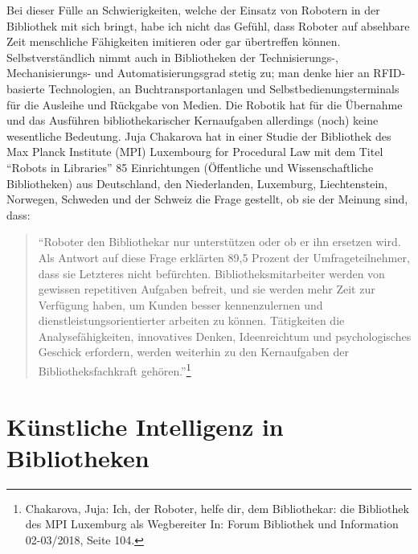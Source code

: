 \documentclass[a4paper,
fontsize=11pt,
oneside,
numbers=noperiodatend,
parskip=half-,
bibliography=totoc,
final
]{scrartcl}
\begin{document}
Bei dieser Fülle an Schwierigkeiten, welche der Einsatz von Robotern in
der Bibliothek mit sich bringt, habe ich nicht das Gefühl, dass Roboter
auf absehbare Zeit menschliche Fähigkeiten imitieren oder gar
übertreffen können. Selbstverständlich nimmt auch in Bibliotheken der
Technisierungs-, Mechanisierungs- und Automatisierungsgrad stetig zu;
man denke hier an RFID-basierte Technologien, an Buchtransportanlagen
und Selbstbedienungsterminals für die Ausleihe und Rückgabe von Medien.
Die Robotik hat für die Übernahme und das Ausführen bibliothekarischer
Kernaufgaben allerdings (noch) keine wesentliche Bedeutung. Juja
Chakarova hat in einer Studie der Bibliothek des Max Planck Institute
(MPI) Luxembourg for Procedural Law mit dem Titel \enquote{Robots in
Libraries} 85 Einrichtungen (Öffentliche und Wissenschaftliche
Bibliotheken) aus Deutschland, den Niederlanden, Luxemburg,
Liechtenstein, Norwegen, Schweden und der Schweiz die Frage gestellt, ob
sie der Meinung sind, dass:

\begin{quote}
\enquote{Roboter den Bibliothekar nur unterstützen oder ob er ihn
ersetzen wird. Als Antwort auf diese Frage erklärten 89,5 Prozent der
Umfrageteilnehmer, dass sie Letzteres nicht befürchten.
Bibliotheksmitarbeiter werden von gewissen repetitiven Aufgaben befreit,
und sie werden mehr Zeit zur Verfügung haben, um Kunden besser
kennenzulernen und dienstleistungsorientierter arbeiten zu können.
Tätigkeiten die Analysefähigkeiten, innovatives Denken, Ideenreichtum
und psychologisches Geschick erfordern, werden weiterhin zu den
Kernaufgaben der Bibliotheksfachkraft gehören.}\footnote{Chakarova,
  Juja: Ich, der Roboter, helfe dir, dem Bibliothekar: die Bibliothek
  des MPI Luxemburg als Wegbereiter In: Forum Bibliothek und Information
  02-03/2018, Seite 104.}
\end{quote}

\hypertarget{kuxfcnstliche-intelligenz-in-bibliotheken}{%
\section{Künstliche Intelligenz in
Bibliotheken}\label{kuxfcnstliche-intelligenz-in-bibliotheken}}
\end{document}
